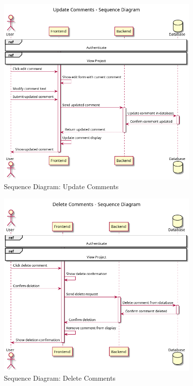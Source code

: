 \begin{figure}[H]
\centering
\includegraphics[width=0.9\textwidth]{conception/SprintV/sequence_diagrams/sequence_communityInteraction_6_6_UpdateComments.png}
\caption{Sequence Diagram: Update Comments}
\label{fig:seq_update_comments}
\end{figure}

\begin{figure}[H]
\centering
\includegraphics[width=0.9\textwidth]{conception/SprintV/sequence_diagrams/sequence_communityInteraction_6_7_DeleteComments.png}
\caption{Sequence Diagram: Delete Comments}
\label{fig:seq_delete_comments}
\end{figure}

